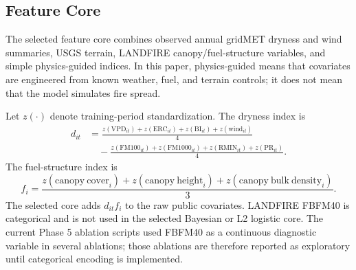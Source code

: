 \documentclass[11pt]{article}
\begin{document}
\subsection{Feature Core}

The selected feature core combines observed annual gridMET dryness and wind
summaries, USGS terrain, LANDFIRE canopy/fuel-structure variables, and simple
physics-guided indices. In this paper, physics-guided means that covariates are
engineered from known weather, fuel, and terrain controls; it does not mean that
the model simulates fire spread.

Let $z(\cdot)$ denote training-period standardization. The dryness index is
\begin{equation}
  \begin{split}
    d_{it}
    &=
    \frac{z(\mathrm{VPD}_{it})+z(\mathrm{ERC}_{it})+z(\mathrm{BI}_{it})+
    z(\mathrm{wind}_{it})}{4}\\
    &\quad -
    \frac{z(\mathrm{FM100}_{it})+z(\mathrm{FM1000}_{it})+
    z(\mathrm{RMIN}_{it})+z(\mathrm{PR}_{it})}{4}.
  \end{split}
\end{equation}
The fuel-structure index is
\begin{equation}
  f_i =
  \frac{
  z(\mathrm{canopy\ cover}_i)+
  z(\mathrm{canopy\ height}_i)+
  z(\mathrm{canopy\ bulk\ density}_i)
  }{3}.
\end{equation}
The selected core adds $d_{it}f_i$ to the raw public covariates. LANDFIRE
FBFM40 is categorical and is not used in the selected Bayesian or L2 logistic
core. The current Phase 5 ablation scripts used FBFM40 as a continuous
diagnostic variable in several ablations; those ablations are therefore
reported as exploratory until categorical encoding is implemented.
\end{document}
